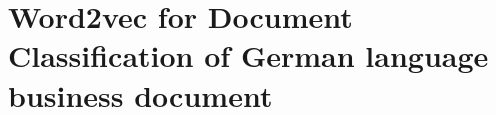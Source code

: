 \section{Word2vec for Document Classification of German language business document}
\label{sec:rel_word2vec_doc_classification}



